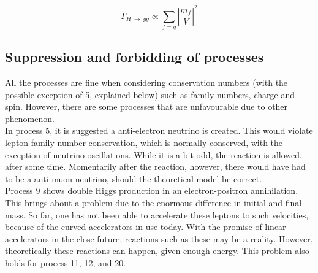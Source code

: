 \documentclass[11pt,a4paper]{article}
\begin{document}
\begin{equation}
	\Gamma_{H \:\rightarrow\: gg} \propto \sum_{f=q}\left|\frac{m_f}{V}\right|^2
\end{equation}



\subsubsection{}

\subsection{Suppression and forbidding of processes}
All the processes are fine when considering conservation numbers (with the possible exception of 5, explained below) such as family numbers, charge and spin. However, there are some processes that are unfavourable due to other phenomenon.\\

In process 5, it is suggested a anti-electron neutrino is created. This would violate lepton family number conservation, which is normally conserved, with the exception of neutrino oscillations. While it is a bit odd, the reaction is allowed, after some time. Momentarily after the reaction, however, there would have had to be a anti-muon neutrino, should the theoretical model be correct.\\

Process 9 shows double Higgs production in an electron-positron annihilation. This brings about a problem due to the enormous difference in initial and final mass. So far, one has not been able to accelerate these leptons to such velocities, because of the curved accelerators in use today. With the promise of linear accelerators in the close future, reactions such as these may be a reality. However, theoretically these reactions can happen, given enough energy. This problem also holds for process 11, 12, and 20.


\end{document}
